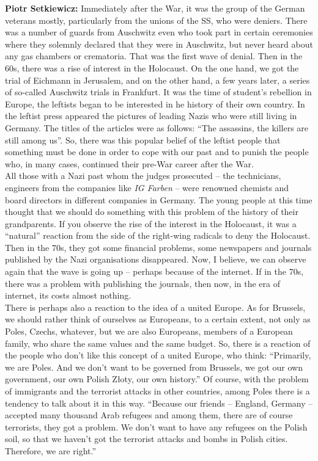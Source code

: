 \textbf{Piotr Setkiewicz:} Immediately after the War, it was the group of the German veterans mostly, particularly from the unions of the SS, who were deniers. There was a number of guards from Auschwitz even who took part in certain ceremonies where they solemnly declared that they were in Auschwitz, but never heard about any gas chambers or crematoria. That was the first wave of denial. Then in the 60s, there was a rise of interest in the Holocaust. On the one hand, we got the trial of Eichmann in Jerusalem, and on the other hand, a few years later, a series of so-called Auschwitz trials in Frankfurt. It was the time of student’s rebellion in Europe, the leftists began to be interested in he history of their own country. In the leftist press appeared the pictures of leading Nazis who were still living in Germany. The titles of the articles were as follows: ``The assassins, the killers are still among us''. So, there was this popular belief of the leftist people that something must be done in order to cope with our past and to punish the people who, in many cases, continued their pre-War career after the War.\\ 
All those with a Nazi past whom the judges prosecuted – the technicians, engineers from the companies like \textit{IG Farben} – were renowned chemists and board directors in different companies in Germany. The young people at this time thought that we should do something with this problem of the history of their grandparents. If you observe the rise of the interest in the Holocaust, it was a ``natural'' reaction from the side of the right-wing radicals to deny the Holocaust.\\
Then in the 70s, they got some financial problems, some newspapers and journals published by the Nazi organisations disappeared. Now, I believe, we can observe again that the wave is going up – perhaps because of the internet. If in the 70s, there was a problem with publishing the journals, then now, in the era of internet, its costs almost nothing.\\ 
There is perhaps also a reaction to the idea of a united Europe. As for Brussels, we should rather think of ourselves as Europeans, to a certain extent, not only as Poles, Czechs, whatever, but we are also Europeans, members of a European family, who share the same values and the same budget. So, there is a reaction of the people who don’t like this concept of a united Europe, who think: ``Primarily, we are Poles. And we don’t want to be governed from Brussels, we got our own government, our own Polish Złoty, our own history.'' Of course, with the problem of immigrants and the terrorist attacks in other countries, among Poles there is a tendency to talk about it in this way. ``Because our friends – England, Germany – accepted many thousand Arab refugees and among them, there are of course terrorists, they got a problem. We don’t want to have any refugees on the Polish soil, so that we haven’t got the terrorist attacks and bombs in Polish cities. Therefore, we are right.''

